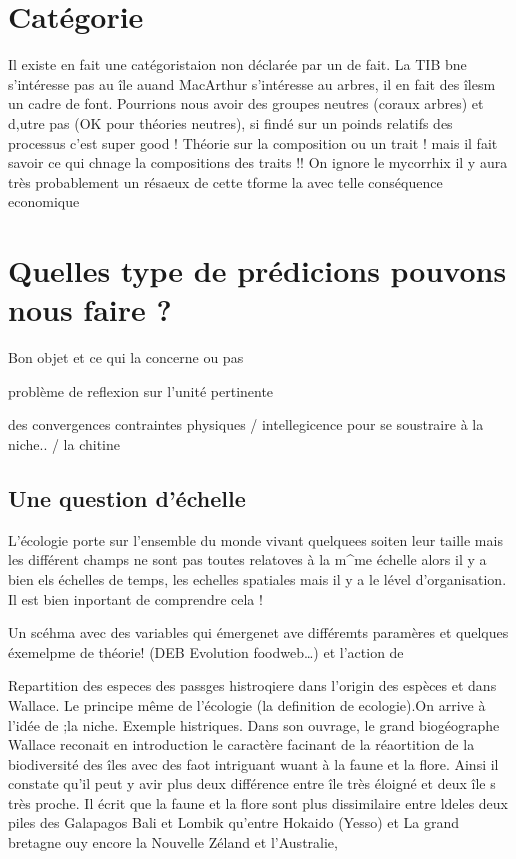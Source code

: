 \section{Catégorie}\label{catuxe9gorie}

Il existe en fait une catégoristaion non déclarée par un de fait. La TIB
bne s'intéresse pas au île auand MacArthur s'intéresse au arbres, il en
fait des îlesm un cadre de font. Pourrions nous avoir des groupes
neutres (coraux arbres) et d,utre pas (OK pour théories neutres), si
findé sur un poinds relatifs des processus c'est super good ! Théorie
sur la composition ou un trait ! mais il fait savoir ce qui chnage la
compositions des traits !! On ignore le mycorrhix il y aura très
probablement un résaeux de cette tforme la avec telle conséquence
economique

\section{Quelles type de prédicions pouvons nous faire
?}\label{quelles-type-de-pruxe9dicions-pouvons-nous-faire}

Bon objet et ce qui la concerne ou pas

problème de reflexion sur l'unité pertinente

des convergences contraintes physiques / intellegicence pour se
soustraire à la niche.. / la chitine

\subsection{Une question d'échelle}\label{une-question-duxe9chelle}

L'écologie porte sur l'ensemble du monde vivant quelquees soiten leur
taille mais les différent champs ne sont pas toutes relatoves à la
m\^{}me échelle alors il y a bien els échelles de temps, les echelles
spatiales mais il y a le lével d'organisation. Il est bien inportant de
comprendre cela !

Un scéhma avec des variables qui émergenet ave différemts paramères et
quelques éxemelpme de théorie! (DEB Evolution foodweb\ldots{}) et
l'action de

Repartition des especes des passges histroqiere dans l'origin des
espèces et dans Wallace. Le principe même de l'écologie (la definition
de ecologie).On arrive à l'idée de ;la niche. Exemple histriques. Dans
son ouvrage, le grand biogéographe Wallace reconait en introduction le
caractère facinant de la réaortition de la biodiversité des îles avec
des faot intriguant wuant à la faune et la flore. Ainsi il constate
qu'il peut y avir plus deux différence entre île très éloigné et deux
île s très proche. Il écrit que la faune et la flore sont plus
dissimilaire entre ldeles deux piles des Galapagos Bali et Lombik
qu'entre Hokaido (Yesso) et La grand bretagne ouy encore la Nouvelle
Zéland et l'Australie,

